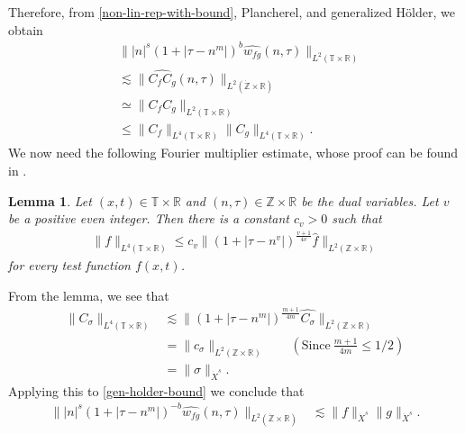 \documentclass[12pt,reqno]{amsart}
\numberwithin{equation}{section}  %
\numberwithin{figure}{section}
\newcommand{\rr}{\mathbb{R}}
\newcommand{\zz}{\mathbb{Z}}
\newcommand{\ci}{\mathbb{T}}
\newcommand{\zzdot}{\dot{\zz}}
\newcommand{\wh}{\widehat}
\theoremstyle{plain}
\newtheorem{lemma}{Lemma}
\theoremstyle{definition}
\theoremstyle{remark}
\begin{document}
%
%
Therefore, from \eqref{non-lin-rep-with-bound}, Plancherel, and generalized 
H\"{o}lder, we obtain
%
%
\begin{equation}
	\label{gen-holder-bound}
	\begin{split}
		& \| |n|^s \left( 1 + | \tau - n^{m } | \right ) ^{b} \wh{w_{fg}}\left( 
		n, \tau \right) \|_{L^2(\ci \times \rr)}
		\\
		& \lesssim \|\wh{C_f C_g }\left( n, \tau \right) 
		\|_{L^2\left( \zzdot \times \rr \right)}
		\\
		& \simeq \|C_f C_g \|_{L^2\left( \ci \times \rr \right)}
		\\
		& \le \|C_f \|_{L^4(\ci \times \rr)} \|C_g \|_{L^4(\ci \times \rr)}.
	\end{split}
\end{equation}
%
We now need the following Fourier multiplier estimate, whose proof can be found
in \cite{Himonas-Misiolek-2001-A-priori-estimates-for-Schrodinger}.
%
\begin{lemma}
	\label{lem:four-mult-est-L4}
	Let $(x, t) \in \ci \times \rr $ and $(n, \tau) \in \zz \times \rr$ be 
	the dual variables. Let $v$ be a positive even integer. Then there is a 
	constant $c_v > 0$ such that
%
%
\begin{equation}
	\label{four-mult-est-L4}
	\begin{split}
		\|f\|_{L^4(\ci \times \rr)} \le c_v \|\left( 1 + | \tau - n^v | 
		\right)^\frac{v+1}{4v} \wh{f} \|_{L^2( \zz \times \rr)}
	\end{split}
\end{equation}
for every test function $f(x, t)$. 
%
%
%
%
\end{lemma}
From the lemma, we see that
%
%
\begin{equation}
	\label{four-mult-conseq}
	\begin{split}
		\|C_\sigma\|_{L^4(\ci \times \rr)} 
		& \lesssim \|(1 + | \tau - n^m |)^{\frac{m+1}{4m}} \wh{C_\sigma}
		\|_{L^2(\zz \times \rr)}
		\\
		& = \|c_{\sigma} \|_{L^2(\zz \times \rr)} \qquad (\text{Since} \ \frac{m+1}{4m} \le 1/2 )
		\\
		& = \|\sigma \|_{\dot{X}^s}. 
	\end{split}
\end{equation}
%
%
Applying this to \eqref{gen-holder-bound} we
conclude that
\begin{equation*}
	\begin{split}
		\| |n|^s \left( 1 + | \tau - n^{m } | \right ) ^{-b} \wh{w_{fg}}\left( 
		n, \tau \right) \|_{L^2(\zzdot \times \rr)}
		& \lesssim \|f\|_{\dot{X}^s} \|g\|_{\dot{X}^s}.
	\end{split}
\end{equation*}
%
%
%
\end{document}
